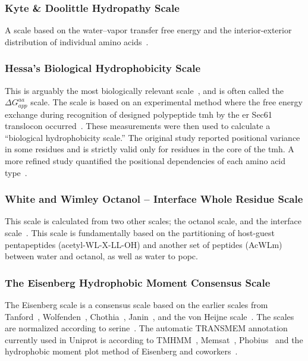 \subsubsection{Kyte \& Doolittle Hydropathy Scale}

A scale based on the water\---vapor transfer free energy and the interior-exterior distribution of individual amino acids~\cite{Kyte1982}.

\subsubsection{Hessa's Biological Hydrophobicity Scale}

This is arguably the most biologically relevant scale~\cite{Peters2014}, and is often called the ${\Delta G}_{app}^{aa}$ scale. The scale is based on an experimental method where the free energy exchange during recognition of designed polypeptide \gls{tmh} by the \gls{er} Sec61 translocon occurred~\cite{Hessa2005}. These measurements were then used to calculate a “biological hydrophobicity scale.” The original study reported positional variance in some residues and is strictly valid only for residues in the core of the \gls{tmh}. A more refined study quantified the positional dependencies of each amino acid type~\cite{Hessa2007}.

\subsubsection{White and Wimley Octanol \--- Interface Whole Residue Scale}

This scale is calculated from two other scales; the octanol scale, and the interface scale~\cite{White1999}. This scale is fundamentally based on the partitioning of host-guest pentapeptides (acetyl-WL-X-LL-OH) and another set of peptides (AcWLm) between water and octanol, as well as water to \gls{popc}.

\subsubsection{The Eisenberg Hydrophobic Moment Consensus Scale}

The Eisenberg scale is a consensus scale based on the earlier scales from Tanford~\cite{Nozaki1971}, Wolfenden~\cite{Rose1993}, Chothia~\cite{Chothia1976}, Janin~\cite{Janin1979}, and the von Heijne scale~\cite{VonHeijne1979}. The scales are normalized according to serine~\cite{Eisenberg1984}. The automatic TRANSMEM annotation currently used in Uniprot is according to TMHMM~\cite{Krogh2001}, Memsat~\cite{Jones2007}, Phobius~\cite{Kall2004} and the hydrophobic moment plot method of Eisenberg and coworkers~\cite{Eisenberg1984}.


